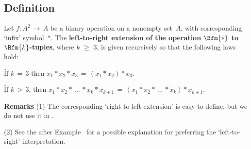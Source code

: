 \VV

            \subsection{\small{\bf Definition}}
            \label{DefA60.30}

\V

        Let $f:A^{2} \,{\rightarrow}\, A$ be a binary operation on a nonempty set~$A$, with corresponding `infix' symbol~${\ast}$.
    The {\bf left-to-right extension of the operation $\Bfm{{\ast}}$ to $\Bfm{k}$-tuples},
    where $k\,\,{\geq}\,\,3$, is given recursively so that the following laws hold:

        \h If $k \,=\, 3$ then $x_{1}{\ast}x_{2}{\ast}x_{3} \,=\, (x_{1}{\ast}x_{2}){\ast}x_{3}$.

        \h If $k\,>\,3$, then $x_{1}{\ast}x_{2}{\ast} \,{\ldots}\,{\ast}x_{k}{\ast}x_{k+1} \,=\, (x_{1}{\ast}x_{2}{\ast} \,{\ldots}\,{\ast}x_{k}){\ast}x_{k+1}$.
                                          
\VV


        {\bf Remarks} (1) The corresponding `right-to-left extension' is easy to define, but we do not use it in {\ThisText}.

\V

        (2) See the {\Note} after Example~ for a possible explanation for preferring the `left-to-right' interpretation.

\VV

